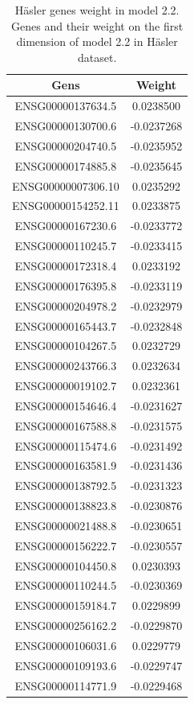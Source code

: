 \documentclass[
  12pt,
  a4paper,
  twoside,
  openright]{book}
\begin{document}
\begin{longtable}[t]{cc}
\caption[Häsler genes weight in model 2.2]{\label{tab:hasler-genes-2-2}Häsler genes weight in model 2.2. Genes and their weight on the first dimension of model 2.2 in Häsler dataset.}\\
\toprule
Gens & Weight\\
\midrule
ENSG00000137634.5 & 0.0238500\\
ENSG00000130700.6 & -0.0237268\\
ENSG00000204740.5 & -0.0235952\\
ENSG00000174885.8 & -0.0235645\\
ENSG00000007306.10 & 0.0235292\\
\addlinespace
ENSG00000154252.11 & 0.0233875\\
ENSG00000167230.6 & -0.0233772\\
ENSG00000110245.7 & -0.0233415\\
ENSG00000172318.4 & 0.0233192\\
ENSG00000176395.8 & -0.0233119\\
\addlinespace
ENSG00000204978.2 & -0.0232979\\
ENSG00000165443.7 & -0.0232848\\
ENSG00000104267.5 & 0.0232729\\
ENSG00000243766.3 & 0.0232634\\
ENSG00000019102.7 & 0.0232361\\
\addlinespace
ENSG00000154646.4 & -0.0231627\\
ENSG00000167588.8 & -0.0231575\\
ENSG00000115474.6 & -0.0231492\\
ENSG00000163581.9 & -0.0231436\\
ENSG00000138792.5 & -0.0231323\\
\addlinespace
ENSG00000138823.8 & -0.0230876\\
ENSG00000021488.8 & -0.0230651\\
ENSG00000156222.7 & -0.0230557\\
ENSG00000104450.8 & 0.0230393\\
ENSG00000110244.5 & -0.0230369\\
\addlinespace
ENSG00000159184.7 & 0.0229899\\
ENSG00000256162.2 & -0.0229870\\
ENSG00000106031.6 & 0.0229779\\
ENSG00000109193.6 & -0.0229747\\
ENSG00000114771.9 & -0.0229468\\
\bottomrule
\end{longtable}
\end{document}
